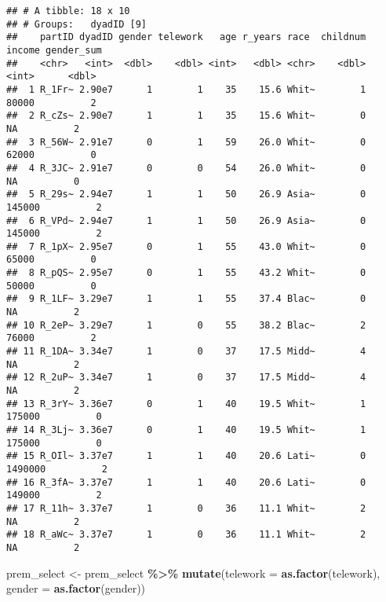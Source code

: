 \documentclass[
]{article}
\newenvironment{Shaded}{\begin{snugshade}}{\end{snugshade}}
\newcommand{\DataTypeTok}[1]{\textcolor[rgb]{0.13,0.29,0.53}{#1}}
\newcommand{\KeywordTok}[1]{\textcolor[rgb]{0.13,0.29,0.53}{\textbf{#1}}}
\newcommand{\NormalTok}[1]{#1}
\newcommand{\OperatorTok}[1]{\textcolor[rgb]{0.81,0.36,0.00}{\textbf{#1}}}
\newcommand{\StringTok}[1]{\textcolor[rgb]{0.31,0.60,0.02}{#1}}
\begin{document}
\begin{verbatim}
## # A tibble: 18 x 10
## # Groups:   dyadID [9]
##    partID dyadID gender telework   age r_years race  childnum  income gender_sum
##    <chr>   <int>  <dbl>    <dbl> <int>   <dbl> <chr>    <dbl>   <int>      <dbl>
##  1 R_1Fr~ 2.90e7      1        1    35    15.6 Whit~        1   80000          2
##  2 R_cZs~ 2.90e7      1        1    35    15.6 Whit~        0      NA          2
##  3 R_56W~ 2.91e7      0        1    59    26.0 Whit~        0   62000          0
##  4 R_3JC~ 2.91e7      0        0    54    26.0 Whit~        0      NA          0
##  5 R_29s~ 2.94e7      1        1    50    26.9 Asia~        0  145000          2
##  6 R_VPd~ 2.94e7      1        1    50    26.9 Asia~        0  145000          2
##  7 R_1pX~ 2.95e7      0        1    55    43.0 Whit~        0   65000          0
##  8 R_pQS~ 2.95e7      0        1    55    43.2 Whit~        0   50000          0
##  9 R_1LF~ 3.29e7      1        1    55    37.4 Blac~        0      NA          2
## 10 R_2eP~ 3.29e7      1        0    55    38.2 Blac~        2   76000          2
## 11 R_1DA~ 3.34e7      1        0    37    17.5 Midd~        4      NA          2
## 12 R_2uP~ 3.34e7      1        0    37    17.5 Midd~        4      NA          2
## 13 R_3rY~ 3.36e7      0        1    40    19.5 Whit~        1  175000          0
## 14 R_3Lj~ 3.36e7      0        1    40    19.5 Whit~        1  175000          0
## 15 R_OIl~ 3.37e7      1        1    40    20.6 Lati~        0 1490000          2
## 16 R_3fA~ 3.37e7      1        1    40    20.6 Lati~        0  149000          2
## 17 R_11h~ 3.37e7      1        0    36    11.1 Whit~        2      NA          2
## 18 R_aWc~ 3.37e7      1        0    36    11.1 Whit~        2      NA          2
\end{verbatim}

\begin{Shaded}
\begin{Highlighting}[]
\NormalTok{prem\_select \textless{}{-}}\StringTok{ }\NormalTok{prem\_select }\OperatorTok{\%\textgreater{}\%}
\StringTok{  }\KeywordTok{mutate}\NormalTok{(}\DataTypeTok{telework =} \KeywordTok{as.factor}\NormalTok{(telework),}
         \DataTypeTok{gender =} \KeywordTok{as.factor}\NormalTok{(gender))}
\end{Highlighting}
\end{Shaded}
\end{document}
